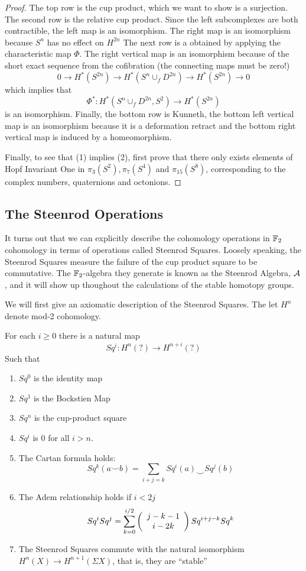\begin{proof}
  The top row is the cup product, which we want to show is a surjection.
  The second row is the relative cup product.  
  Since the left subcomplexes are both contractible, the left map is an isomorphism.
  The right map is an isomorphism because $S^n$ has no effect on $H^{2n}$
  The next row is a obtained by applying the characteristic map $\Phi$.  
  The right vertical map is an isomorphism because of the short exact sequence from the cofibration (the connecting maps must be zero!) 
  \[0\to H^*(S^{2n})\to H^*(S^{n}\cup_f D^{2n})\to H^*(S^{2n})\to 0 \]
  which implies that
  \[\Phi^*:H^*(S^{n}\cup_f D^{2n},S^{2})\to H^*(S^{2n})\]
  is an isomorphism.
  Finally, the bottom row is Kunneth, the bottom left vertical map is an isomorphism because it is a deformation retract and the bottom right vertical map is induced by a homeomorphism.  


Finally, to see that (1) implies (2), first prove that there only exists elements of Hopf Invariant One in $\pi_3(S^2),\pi_7(S^4)$ and $\pi_{15}(S^8)$, corresponding to the complex numbers, quaternions and octonions.  

\end{proof}


\subsection{The Steenrod Operations}

\label{sec:SteenrodCohom}

It turns out that we can explicitly describe the cohomology operations in $\mathbb{F}_2$ cohomology in terms of operations called Steenrod Squares.  
Loosely speaking, the Steenrod Squares measure the failure of the cup product square to be commutative.  
The $\mathbb{F}_2$-algebra they generate is known as the Steenrod Algebra, $\mathcal{A}$, and it will show up thoughout the calculations of the stable homotopy groups.  

We will first give an axiomatic description of the Steenrod Squares.
The let $H^n$ denote mod-2 cohomology.  

\begin{Theorem}
  For each $i\ge 0$ there is a natural map
  \[Sq^i:H^n(?)\to H^{n+i}(?)\]
  Such that
  \begin{enumerate}
    \item $Sq^0$ is the identity map
    \item $Sq^1$ is the Bockstien Map
    \item $Sq^n$ is the cup-product square
    \item $Sq^i$ is 0 for all $i>n$.  
    \item The Cartan formula holds:
      \[Sq^k(a\smile b)=\sum_{i+j=k}Sq^i(a)\smile Sq^j(b)\]
    \item The Adem relationship holds if $i<2j$
      \[Sq^iSq^j=\sum_{k=0}^{i/2}\left(\begin{array}{c}j-k-1\\i-2k\end{array}\right)Sq^{i+j-k}Sq^k\]
    \item The Steenrod Squares commute with the natural isomorphism $H^n(X)\to H^{n+1}(\Sigma X)$, that is, they are ``stable''
  \end{enumerate}
\end{Theorem}


